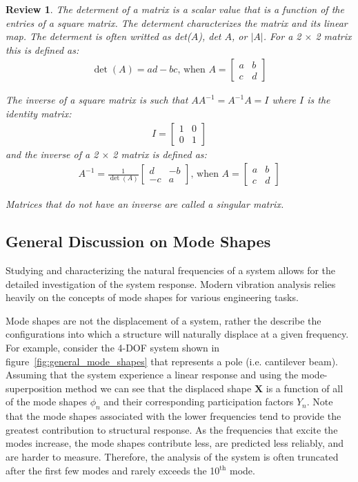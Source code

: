 \documentclass[12pt,letter]{article}
\numberwithin{ex}{section} %
\newtheorem{re}{Review}
\numberwithin{re}{section} %
\newenvironment{review}{\begin{mdframed}[middlelinewidth=2mm,roundcorner=20pt]\begin{re}\normalfont}{\end{re}\end{mdframed}}
\newcommand{\rd}[1]{\textcolor[rgb]{0.75,0.00,0.00}{#1}}
\begin{document}
\begin{review}
The determent of a matrix is a scalar value that is a function of the entries of a square matrix. The determent characterizes the matrix and its linear map. The determent is often writted as det($A$), det $A$, or $|A|$. For a 2 $\times$ 2 matrix this is defined as:
\begin{eqnarray}
\det (A) = ad-bc  \text{, when } A = \begin{bmatrix} a & b \\ c & d \end{bmatrix}
\end{eqnarray}

The inverse of a square matrix is such that $AA^{-1} = A^{-1}A=I$ where $I$ is the identity matrix:
\begin{eqnarray}
I = \begin{bmatrix} 1 & 0 \\ 0 & 1 \end{bmatrix} 
\end{eqnarray}
and the inverse of a 2 $\times$ 2 matrix is defined as:
\begin{eqnarray}
A^{-1} = \frac{1}{\det (A)} \begin{bmatrix} d & -b \\ -c & a \end{bmatrix} \text{, when } A = \begin{bmatrix} a & b \\ c & d \end{bmatrix}
\end{eqnarray}

Matrices that do not have an inverse are called a singular matrix. 
\end{review}

\subsection{General Discussion on Mode Shapes}

Studying and characterizing the natural frequencies of a system allows for the detailed investigation of the system response. Modern vibration analysis relies heavily on the concepts of mode shapes for various engineering tasks. 


Mode shapes are not the displacement of a system, rather the describe the configurations into which a structure will naturally displace at a given frequency. For example, consider the 4-DOF system shown in figure~\ref{fig:general_mode_shapes} that represents a pole (i.e. cantilever beam). Assuming that the system experience a linear response and using the mode-superposition method we can see that the displaced shape $\textbf{X}$ is a function of all of the mode shapes $\phi_n$ and their corresponding \rd{}participation factors $Y_n$. Note that the mode shapes associated with the lower frequencies tend to provide the greatest contribution to structural response. As the frequencies that excite the modes increase, the mode shapes contribute less, are predicted less reliably, and are harder to measure. Therefore, the analysis of the system is often truncated after the first few modes and rarely exceeds the 10$^{\text{th}}$ mode. 
\end{document}

